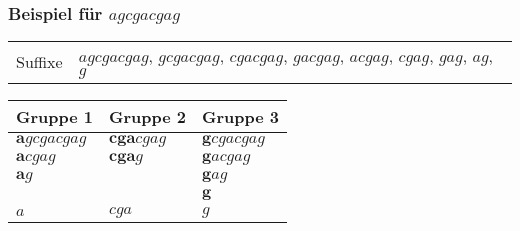\documentclass{beamer}
\begin{document}
\begin{frame}
\frametitle{Beispiel für $agcgacgag$}
\begin{tabularx}{\textwidth}{l X}
Suffixe &  $agcgacgag$, $gcgacgag$, $cgacgag$, $gacgag$, $acgag$, $cgag$, $gag$, $ag$, $g$ \\
\end{tabularx}
\begin{table}
\begin{tabular}{l l l}
    \toprule
    Gruppe 1                 & Gruppe 2               & Gruppe 3                \\
    \midrule
    $\boldsymbol{a}gcgacgag$ & $\boldsymbol{cga}cgag$ & $\boldsymbol{g}cgacgag$ \\
    $\boldsymbol{a}cgag$     & $\boldsymbol{cga}g$    & $\boldsymbol{g}acgag$   \\
    $\boldsymbol{a}g$        &                        & $\boldsymbol{g}ag$      \\
                             &                        & $\boldsymbol{g}$        \\
    \midrule
    $a$                      & $cga$                  & $g$                     \\
    \bottomrule
\end{tabular}
\end{table}
\end{frame}
\end{document}
